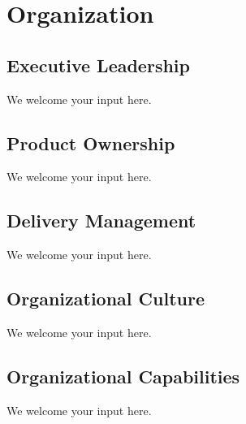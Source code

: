 \part{Organization}\label{pt:organization} %

\chapter{Executive Leadership}

We welcome your input here.

\chapter{Product Ownership}

We welcome your input here.

\chapter{ Delivery Management}

We welcome your input here.

\chapter{Organizational Culture}

We welcome your input here.

\chapter{Organizational Capabilities}

We welcome your input here.

